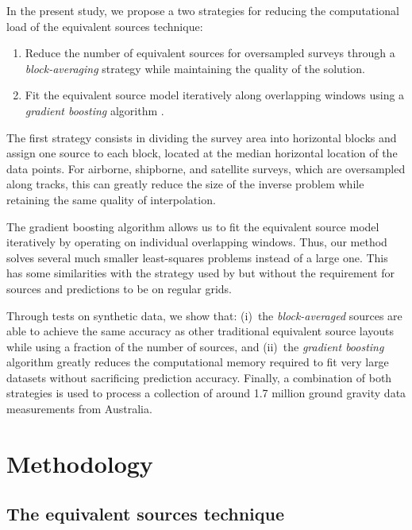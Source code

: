 In the present study,
we propose a two strategies for reducing the computational load of
the equivalent sources technique:

\begin{enumerate}
    \item Reduce the number of equivalent sources for oversampled surveys
      through a \emph{block-averaging} strategy while maintaining the quality
      of the solution.
    \item Fit the equivalent source model iteratively along overlapping windows
      using a \emph{gradient boosting} algorithm \citep{friedman2001}.
\end{enumerate}

The first strategy consists in dividing the survey area into horizontal blocks
and assign one source to each block, located at the median horizontal location
of the data points. For airborne, shipborne, and satellite surveys, which are
oversampled along tracks, this can greatly reduce the size of the inverse
problem while retaining the same quality of interpolation.

The gradient boosting algorithm allows us to fit the equivalent source model
iteratively by operating on individual overlapping windows.
Thus, our method solves several much smaller least-squares problems instead of
a large one.
This has some similarities with the strategy used by \citet{leao1989} but
without the requirement for sources and predictions to be on regular grids.

Through tests on synthetic data, we show that:
(i)~the \emph{block-averaged} sources are able to achieve the same accuracy as
other traditional equivalent source layouts while using a fraction of the
number of sources, and
(ii)~the \emph{gradient boosting} algorithm greatly reduces the computational
memory required to fit very large datasets without sacrificing prediction
accuracy.
Finally, a combination of both strategies is used to process a collection of
around 1.7 million ground gravity data measurements from Australia.


\section{Methodology}

\subsection{The equivalent sources technique}


